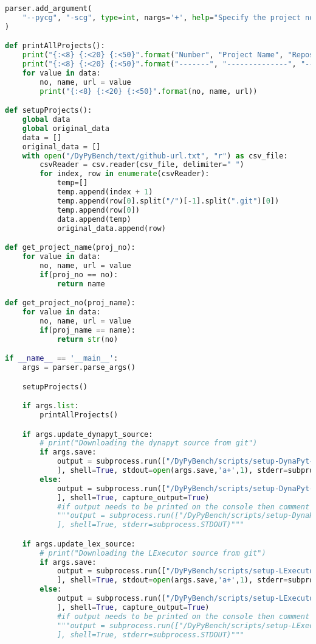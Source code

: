 \begin{lstlisting}[caption=Access Interface of DyPyBench,label=code:dypybench.py,language=Python]
parser.add_argument(
    "--pycg", "-scg", type=int, nargs='+', help="Specify the project no. to run PyCG for static call graph generation"
)

def printAllProjects():
    print("{:<8} {:<20} {:<50}".format("Number", "Project Name", "Repository URL"))
    print("{:<8} {:<20} {:<50}".format("-------", "--------------", "---------------------------------"))
    for value in data:
        no, name, url = value
        print("{:<8} {:<20} {:<50}".format(no, name, url))

def setupProjects():
    global data
    global original_data
    data = []
    original_data = []
    with open("/DyPyBench/text/github-url.txt", "r") as csv_file:
        csvReader = csv.reader(csv_file, delimiter=" ")
        for index, row in enumerate(csvReader):
            temp=[]
            temp.append(index + 1)
            temp.append(row[0].split("/")[-1].split(".git")[0])
            temp.append(row[0])
            data.append(temp)
            original_data.append(row)

def get_project_name(proj_no):
    for value in data:
        no, name, url = value
        if(proj_no == no):
            return name

def get_project_no(proj_name):
    for value in data:
        no, name, url = value
        if(proj_name == name):
            return str(no)

if __name__ == '__main__':
    args = parser.parse_args()

    setupProjects()

    if args.list:
        printAllProjects()

    if args.update_dynapyt_source:
        # print("Downloading the dynapyt source from git")
        if args.save:
            output = subprocess.run(["/DyPyBench/scripts/setup-DynaPyt-src.sh"
            ], shell=True, stdout=open(args.save,'a+',1), stderr=subprocess.STDOUT)
        else:
            output = subprocess.run(["/DyPyBench/scripts/setup-DynaPyt-src.sh"
            ], shell=True, capture_output=True)
            #if output needs to be printed on the console then comment above and uncomment below
            """output = subprocess.run(["/DyPyBench/scripts/setup-DynaPyt-src.sh"
            ], shell=True, stderr=subprocess.STDOUT)"""

    if args.update_lex_source:
        # print("Downloading the LExecutor source from git")
        if args.save:
            output = subprocess.run(["/DyPyBench/scripts/setup-LExecutor-src.sh"
            ], shell=True, stdout=open(args.save,'a+',1), stderr=subprocess.STDOUT)
        else:
            output = subprocess.run(["/DyPyBench/scripts/setup-LExecutor-src.sh"
            ], shell=True, capture_output=True)
            #if output needs to be printed on the console then comment above and uncomment below
            """output = subprocess.run(["/DyPyBench/scripts/setup-LExecutor-src.sh"
            ], shell=True, stderr=subprocess.STDOUT)"""


\end{lstlisting}
